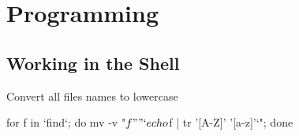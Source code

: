 \chapter{Programming}

\section*{Working in the Shell}

Convert all files names to lowercase

\begin{term}
for f in `find`; do mv -v "$f" "`echo $f | tr '[A-Z]' '[a-z]'`"; done
\end{term}


